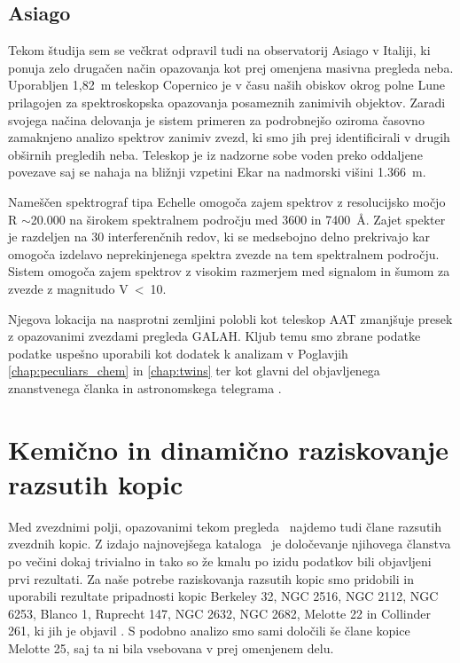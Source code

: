 \subsection{Asiago}
\label{sec:slo_asiago}
Tekom študija sem se večkrat odpravil tudi na observatorij Asiago v Italiji, ki ponuja zelo drugačen način opazovanja kot prej omenjena masivna pregleda neba. Uporabljen 1,82~m teleskop Copernico je v času naših obiskov okrog polne Lune prilagojen za spektroskopska opazovanja posameznih zanimivih objektov. Zaradi svojega načina delovanja je sistem primeren za podrobnejšo oziroma časovno zamaknjeno analizo spektrov zanimiv zvezd, ki smo jih prej identificirali v drugih obširnih pregledih neba. Teleskop je iz nadzorne sobe voden preko oddaljene povezave saj se nahaja na bližnji vzpetini Ekar na nadmorski višini 1.366~m. 

Nameščen spektrograf tipa Echelle omogoča zajem spektrov z resolucijsko močjo R $\sim$20.000 na širokem spektralnem področju med 3600 in 7400~\AA. Zajet spekter je razdeljen na 30 interferenčnih redov, ki se medsebojno delno prekrivajo kar omogoča izdelavo neprekinjenega spektra zvezde na tem spektralnem področju. Sistem omogoča zajem spektrov z visokim razmerjem med signalom in šumom za zvezde z magnitudo V~<~10. 

Njegova lokacija na nasprotni zemljini polobli kot teleskop AAT zmanjšuje presek z opazovanimi zvezdami pregleda GALAH. Kljub temu smo zbrane podatke podatke uspešno uporabili kot dodatek k analizam v Poglavjih \ref{chap:peculiars_chem} in \ref{chap:twins} ter kot glavni del objavljenega znanstvenega članka \cite{2019MNRAS.488.5536M} in astronomskega telegrama \cite{2019ATel13340....1M}.

\section{Kemično in dinamično raziskovanje razsutih kopic}
\label{sec:slo_kopice_taziskovanje}
Med zvezdnimi polji, opazovanimi tekom pregleda \Gh\ najdemo tudi člane razsutih zvezdnih kopic. Z izdajo najnovejšega kataloga \Gs\ je določevanje njihovega članstva po večini dokaj trivialno in tako so že kmalu po izidu podatkov bili objavljeni prvi rezultati. Za naše potrebe raziskovanja razsutih kopic smo pridobili in uporabili rezultate pripadnosti kopic Berkeley 32, NGC 2516, NGC 2112, NGC 6253, Blanco 1, Ruprecht 147, NGC 2632, NGC 2682,  Melotte 22 in Collinder 261, ki jih je objavil \citet{2018A&A...618A..93C}. S podobno analizo smo sami določili še člane kopice Melotte 25, saj ta ni bila vsebovana v prej omenjenem delu.

